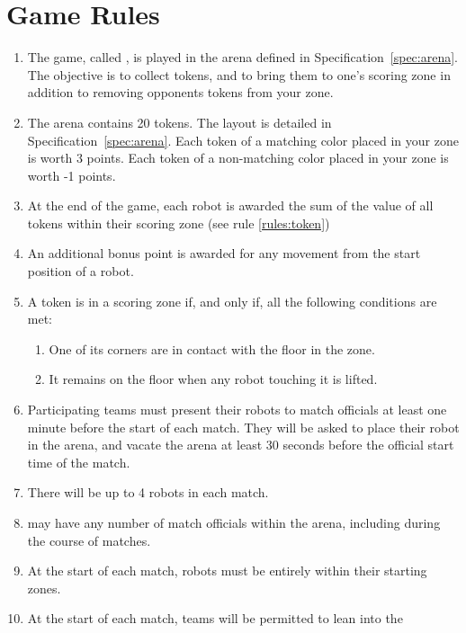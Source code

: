 \section{Game Rules}
\label{sec:rules}

\begin{enumerate}
  \item The game, called \emph{\gamename}, is played in the arena defined in
        Specification~\ref{spec:arena}. The objective is to collect tokens, and
        to bring them to one's scoring zone in addition to removing opponents
        tokens from your zone.
  \item The arena contains 20 tokens. The layout is detailed in
        Specification~\ref{spec:arena}. Each token of a matching color placed
        in your zone is worth 3 points. Each token of a non-matching color
        placed in your zone is worth -1 points.
  \item At the end of the game, each robot is awarded the sum of the value of
        all tokens within their scoring zone (see rule \ref{rules:token})
  \item An additional bonus point is awarded for any movement from the
        start position of a robot.
  \item \label{rules:token}A token is in a scoring zone if, and only if, all
        the following conditions are met:
        \begin{enumerate}
          \item One of its corners are in contact with the floor in
                the zone.
          \item It remains on the floor when any robot touching it is lifted.
        \end{enumerate}
  \item Participating teams must present their robots to match officials at
        least one minute before the start of each match. They will be asked to
        place their robot in the arena, and vacate the arena at least 30
        seconds before the official start time of the match.
  \item There will be up to 4 robots in each match.
  \item \org may have any number of match officials within the arena, including
        during the course of matches.
  \item At the start of each match, robots must be entirely within their
        starting zones.
  \item At the start of each match, teams will be permitted to lean into the

\end{enumerate}
